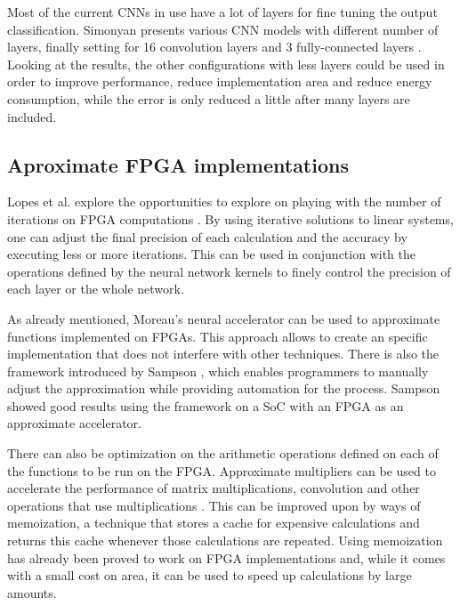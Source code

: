 Most of the current CNNs in use have a lot of layers for fine tuning the output classification.
Simonyan presents various CNN models with different number of layers, finally setting for
16 convolution layers and 3 fully-connected layers \cite{simonyan2014very}. Looking at the 
results, the other configurations with less layers could be used in order to improve performance,
reduce implementation area and reduce energy consumption, while the error is only
reduced a little after many layers are included.

\subsection{Aproximate FPGA implementations}

Lopes et al. explore the opportunities to explore on playing with the number of iterations
on FPGA computations \cite{roldao2009more}. By using iterative solutions to linear systems, one can adjust the
final precision of each calculation and the accuracy by executing less or more iterations.
This can be used in conjunction with the operations defined by the neural network kernels 
to finely control the precision of each layer or the whole network.

As already mentioned, Moreau's neural accelerator can be used to approximate functions implemented
on FPGAs. This approach allows to create an specific implementation that does not interfere
with other techniques. There is also the framework introduced by Sampson \cite{sampson2015accept},
which enables programmers to manually adjust the approximation while providing automation
for the process. Sampson showed good results using the framework on a SoC with an FPGA as an
approximate accelerator.

There can also be optimization on the arithmetic operations defined on each of the functions
to be run on the FPGA. Approximate multipliers can be used to accelerate the performance
of matrix multiplications, convolution and other operations that use multiplications
\cite{ullah2018smapproxlib}. This can be improved upon by ways of memoization, a technique
that stores a cache for expensive calculations and returns this cache whenever those
calculations are repeated. Using memoization has already been proved to work on FPGA
implementations \cite{sinha2016low} and, while it comes with a small cost on area, it can be used to speed
up calculations by large amounts.

\section{\intelOCLnos}


